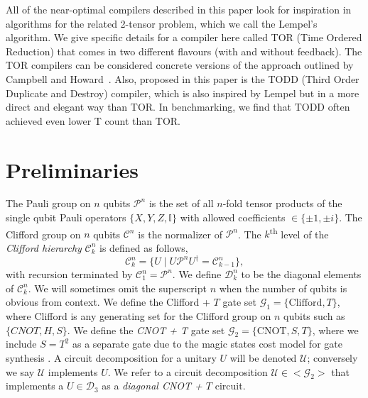 \documentclass[notitlepage]{article}
\theoremstyle{definition}
\theoremstyle{problem}
\theoremstyle{lemma}
\begin{document}
		All of the near-optimal compilers described in this paper look for inspiration in algorithms for the related 2-tensor problem, which we call the Lempel's algorithm.  We give specific details for a compiler here called TOR (Time Ordered Reduction) that comes in two different flavours (with and without feedback).  The TOR compilers can be considered concrete versions of the approach outlined by Campbell and Howard~\cite{campbell17b}.  Also, proposed in this paper is the TODD (Third Order Duplicate and Destroy) compiler, which is also inspired by Lempel but in a more direct and elegant way than TOR.  In benchmarking, we find that TODD often achieved even lower T count than TOR.  
		
	\FloatBarrier
	
	\section{Preliminaries}	
	The Pauli group on $n$ qubits $\mathcal{P}^n$ is the set of all $n$-fold tensor products of the single qubit Pauli operators $\{X, Y, Z, \mathbb{I}\}$ with allowed coefficients $\in \{\pm1,\pm i\}$.
	The Clifford group on $n$ qubits $\mathcal{C}^n$ is the normalizer of $\mathcal{P}^n$.
	The $k$\textsuperscript{th} level of the \emph{Clifford hierarchy} $\mathcal{C}_k^n$ is defined as follows,
	\begin{equation}
	\mathcal{C}_k^n = \{U \mid U\mathcal{P}^n U^\dagger = \mathcal{C}_{k-1}^n\},
	\end{equation}
	with recursion terminated by $\mathcal{C}^n_1 = \mathcal{P}^n$.
	We define $\mathcal{D}_k^n$ to be the diagonal elements of $\mathcal{C}_k^n$. We will sometimes omit the superscript $n$ when the number of qubits is obvious from context.
	We define the Clifford + $T$ gate set $\mathcal{G}_1 = \{\mathrm{Clifford}, T\}$, where Clifford is any generating set for the Clifford group on $n$ qubits such as $\{CNOT,H,S\}$.
	We define the \emph{CNOT + T} gate set $\mathcal{G}_2 = \{\mathrm{CNOT}, S, T\}$, where we include $S=T^2$ as a separate gate due to the magic states cost model for gate synthesis \cite{BraKit05}.
	A circuit decomposition for a unitary $U$ will be denoted $\mathcal{U}$; conversely we say $\mathcal{U}$ implements $U$. We refer to a circuit decomposition $\mathcal{U}\in <\mathcal{G}_2>$ that implements a $U\in \mathcal{D}_3$ as a \emph{diagonal CNOT + $T$} circuit.
	
	
\end{document}
